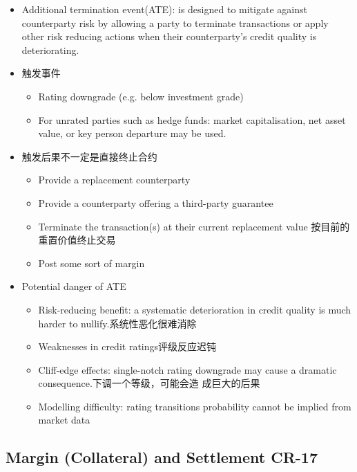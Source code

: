 \begin{itemize}
\begin{itemize}
    \item Additional termination event(ATE): is designed to mitigate against counterparty risk by allowing a party to terminate transactions or apply other risk reducing actions when their counterparty's credit quality is deteriorating.
    \item 触发事件
    \begin{itemize}
    \item Rating downgrade (e.g. below investment grade)
    \item For unrated parties such as hedge funds: market capitalisation, net asset value, or key person departure may be used.
    \end{itemize}
    \item 触发后果不一定是直接终止合约
    \begin{itemize}
    \item Provide a replacement counterparty
    \item Provide a counterparty offering a third-party guarantee
    \item Terminate the transaction(s) at their current replacement value 按目前的重置价值终止交易
    \item Post some sort of margin
    \end{itemize}
\item Potential danger of ATE
\begin{itemize}
    \item Risk-reducing benefit: a systematic deterioration in credit quality is much harder to nullify.系统性恶化很难消除
    \item Weaknesses in credit ratings评级反应迟钝
    \item Cliff-edge effects: single-notch rating downgrade may cause a dramatic consequence.下调一个等级，可能会造
    成巨大的后果
    \item Modelling difficulty: rating transitions probability cannot be implied from market data
\end{itemize}


\end{itemize}


\end{itemize}





\subsection{Margin (Collateral) and Settlement CR-17}
